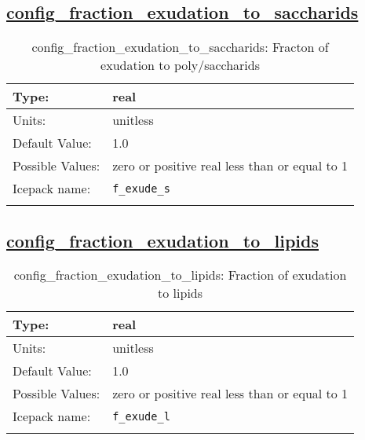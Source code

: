 \subsection[config\_fraction\_exudation\_to\_saccharids]{\hyperref[sec:nm_tab_biogeochemistry]{config\_fraction\_exudation\_to\_saccharids}}
\label{subsec:nm_sec_config_fraction_exudation_to_saccharids}
\begin{center}
\begin{longtable}{| p{2.0in} || p{4.0in} |}
    \hline
    Type: & real \\
    \hline
    Units: & \si{unitless} \\
    \hline
    Default Value: & 1.0 \\
    \hline
    Possible Values: & zero or positive real less than or equal to 1 \\
    \hline
    \hline
    Icepack name: & \verb+f_exude_s+ \\
    \caption{config\_fraction\_exudation\_to\_saccharids: Fracton of exudation to poly/saccharids}
\end{longtable}
\end{center}
\subsection[config\_fraction\_exudation\_to\_lipids]{\hyperref[sec:nm_tab_biogeochemistry]{config\_fraction\_exudation\_to\_lipids}}
\label{subsec:nm_sec_config_fraction_exudation_to_lipids}
\begin{center}
\begin{longtable}{| p{2.0in} || p{4.0in} |}
    \hline
    Type: & real \\
    \hline
    Units: & \si{unitless} \\
    \hline
    Default Value: & 1.0 \\
    \hline
    Possible Values: & zero or positive real less than or equal to 1 \\
    \hline
    \hline
    Icepack name: & \verb+f_exude_l+ \\
    \caption{config\_fraction\_exudation\_to\_lipids: Fraction of exudation to lipids}
\end{longtable}
\end{center}
